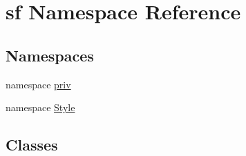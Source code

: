 \hypertarget{namespacesf}{\section{sf Namespace Reference}
\label{namespacesf}
}
\subsection*{Namespaces}
\begin{DoxyCompactItemize}
\item 
namespace \hyperlink{namespacesf_1_1priv}{priv}
\item 
namespace \hyperlink{namespacesf_1_1_style}{Style}
\end{DoxyCompactItemize}
\subsection*{Classes}
